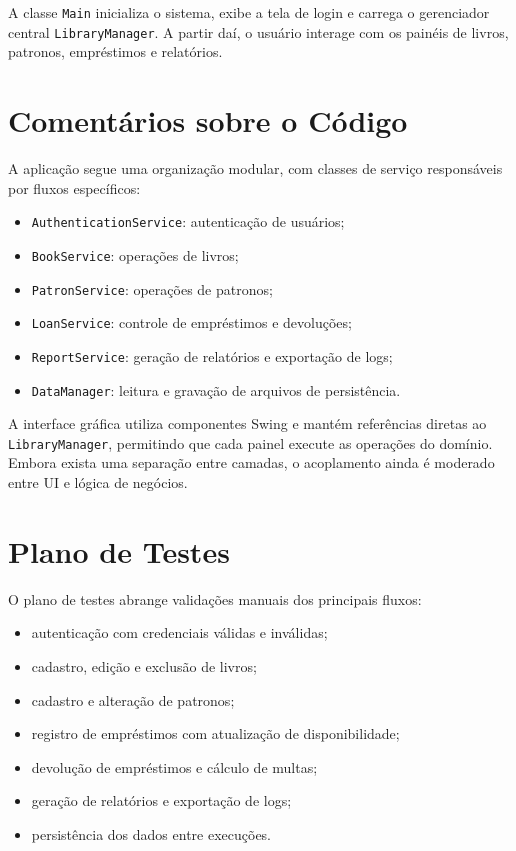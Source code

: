 \documentclass[conference]{IEEEtran}
\begin{document}
A classe \texttt{Main} inicializa o sistema, exibe a tela de login e carrega o gerenciador central \texttt{LibraryManager}. A partir daí, o usuário interage com os painéis de livros, patronos, empréstimos e relatórios.

\section{Comentários sobre o Código}
A aplicação segue uma organização modular, com classes de serviço responsáveis por fluxos específicos:
\begin{itemize}
    \item \texttt{AuthenticationService}: autenticação de usuários;
    \item \texttt{BookService}: operações de livros;
    \item \texttt{PatronService}: operações de patronos;
    \item \texttt{LoanService}: controle de empréstimos e devoluções;
    \item \texttt{ReportService}: geração de relatórios e exportação de logs;
    \item \texttt{DataManager}: leitura e gravação de arquivos de persistência.
\end{itemize}

A interface gráfica utiliza componentes Swing e mantém referências diretas ao \texttt{LibraryManager}, permitindo que cada painel execute as operações do domínio. Embora exista uma separação entre camadas, o acoplamento ainda é moderado entre UI e lógica de negócios.

\section{Plano de Testes}
O plano de testes abrange validações manuais dos principais fluxos:
\begin{itemize}
    \item autenticação com credenciais válidas e inválidas;
    \item cadastro, edição e exclusão de livros;
    \item cadastro e alteração de patronos;
    \item registro de empréstimos com atualização de disponibilidade;
    \item devolução de empréstimos e cálculo de multas;
    \item geração de relatórios e exportação de logs;
    \item persistência dos dados entre execuções.
\end{itemize}
\end{document}
